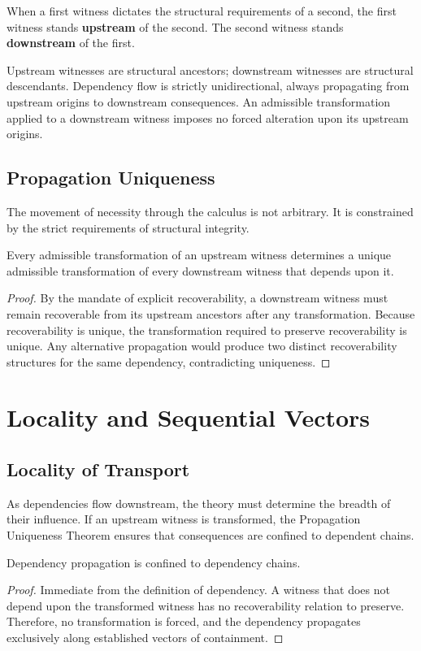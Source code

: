 \documentclass[12pt,anyside]{book}
\begin{document}
When a first witness dictates the structural requirements of a second, the first witness stands \textbf{upstream} of the second. The second witness stands \textbf{downstream} of the first. 

Upstream witnesses are structural ancestors; downstream witnesses are structural descendants. Dependency flow is strictly unidirectional, always propagating from upstream origins to downstream consequences. An admissible transformation applied to a downstream witness imposes no forced alteration upon its upstream origins.

\subsection{Propagation Uniqueness}
The movement of necessity through the calculus is not arbitrary. It is constrained by the strict requirements of structural integrity.

\begin{theorem}
Every admissible transformation of an upstream witness determines a unique admissible transformation of every downstream witness that depends upon it.
\end{theorem}
\begin{proof}
By the mandate of explicit recoverability, a downstream witness must remain recoverable from its upstream ancestors after any transformation. Because recoverability is unique, the transformation required to preserve recoverability is unique. Any alternative propagation would produce two distinct recoverability structures for the same dependency, contradicting uniqueness.
\end{proof}

\section{Locality and Sequential Vectors}

\subsection{Locality of Transport}
As dependencies flow downstream, the theory must determine the breadth of their influence. If an upstream witness is transformed, the Propagation Uniqueness Theorem ensures that consequences are confined to dependent chains.

\begin{theorem}
Dependency propagation is confined to dependency chains.
\end{theorem}
\begin{proof}
Immediate from the definition of dependency. A witness that does not depend upon the transformed witness has no recoverability relation to preserve. Therefore, no transformation is forced, and the dependency propagates exclusively along established vectors of containment.
\end{proof}
\end{document}

